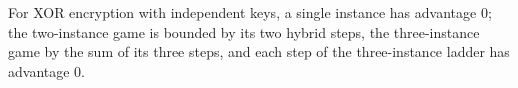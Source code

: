 \begin{theorem}
  \label{thm:deephybrid}
  \leanok
  For XOR encryption with independent keys, a single instance has advantage $0$;
  the two-instance game is bounded by its two hybrid steps, the three-instance
  game by the sum of its three steps, and each step of the three-instance ladder
  has advantage $0$.
\end{theorem}
